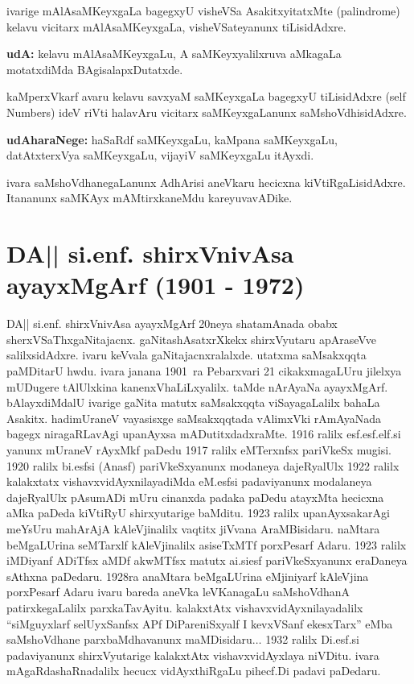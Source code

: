 ivarige mAlAsaMKeyxgaLa bagegxyU visheVSa AsakitxyitatxMte {\rm (palindrome)}
kelavu vicitarx mAlAsaMKeyxgaLa, visheVSateyanunx tiLisidAdxre.

\textbf{udA:} kelavu mAlAsaMKeyxgaLu, A saMKeyxyalilxruva aMkagaLa motatxdiMda BAgisalapx\-Dutatxde.

kaMperxVkarf avaru kelavu savxyaM saMKeyxgaLa bagegxyU tiLisidAdxre {\rm (self Numbers)}
 ideV riVti halavAru vicitarx saMKeyxgaLanunx saMshoVdhisidAdxre. 

\textbf{udAharaNege:} haSaRdf saMKeyxgaLu, kaMpana saMKeyxgaLu, datAtxterxVya saMKeyxgaLu, vijayiV saMKeyxgaLu itAyxdi.

ivara saMshoVdhanegaLanunx AdhArisi aneVkaru hecicxna kiVtiRgaLisidAdxre. Itananunx saMKAyx mAMtirxkaneMdu kareyuvavADike.

\section{DA|| si.enf. shirxVnivAsa ayayxMgArf {\rm (1901 - 1972)}}

DA|| si.enf. shirxVnivAsa ayayxMgArf {\rm 20}neya shatamAnada obabx sherxVSaThxgaNitajacnx. gaNita\-shAsatxrXkekx shirxVyutaru apAraseVve salilxsidAdxre. ivaru keVvala gaNitajacnxralalxde. utatxma saMsakxqqta paMDitarU hwdu. ivara janana {\rm 1901}~ra Pebarxvari {\rm 21} cikakxmagaLUru jilelxya mUDugere tAlUlxkina kanenxVhaLiLxyalilx. taMde nArAyaNa ayayxMgArf. bAlayx\-diMdalU ivarige gaNita matutx saMsakxqqta viSayagaLalilx bahaLa Asakitx. hadimUraneV vayasisxge saMsakxqq\-tada vAlimxVki rAmAyaNada bagegx niragaRLavAgi upanAyxsa mADutitxdadxraMte. {\rm 1916} ralilx esf.esf.elf.si yanunx mUraneV rAyxMkf paDedu {\rm 1917} ralilx eMTerxnfsx pariVkeSx mugisi. {\rm 1920} ralilx bi.esfsi (Anasf) pariVkeSxyanunx modaneya dajeRyalUlx {\rm 1922} ralilx kalakxtatx vishavxvidAyxnilayadiMda eM.esfsi padaviyanunx modalaneya dajeRyalUlx pAsumADi mUru cinanxda padaka paDedu atayxMta hecicxna aMka paDeda kiVtiRyU shirxyutarige baMditu. {\rm 1923} ralilx upanAyxsakarAgi meYsUru mahArAjA kAleVjinalilx vaqtitx jiVvana AraMBisidaru. naMtara beMgaLUrina seMTarxlf kAleVjinalilx asiseTxMTf porxPesarf Adaru. {\rm 1923} ralilx iMDiyanf ADiTfsx aMDf akwMTfsx matutx ai.siesf pariVkeSxyanunx eraDaneya sAthxna paDedaru. {\rm 1928}ra anaMtara beMgaLUrina eMjiniyarf kAleVjina porxPesarf Adaru ivaru bareda aneVka leVKanagaLu saMshoVdhanA patirxkegaLalilx parxkaTavAyitu. kalakxtAtx vishavxvidAyxnilayadalilx ``siMguyxlarf selUyxSanfsx APf DiPareniSxyalf I kevxVSanf ekesxTarx'' eMba saMshoVdhane parxbaMdhavanunx maMDisidaru$\ldots$ {\rm 1932} ralilx Di.esf.si padaviyanunx shirxVyutarige kalakxtAtx vishavxvidAyxlaya niVDitu. ivara mAgaRdashaRnadalilx hecucx vidAyxthiRgaLu pihecf.Di padavi paDedaru.

